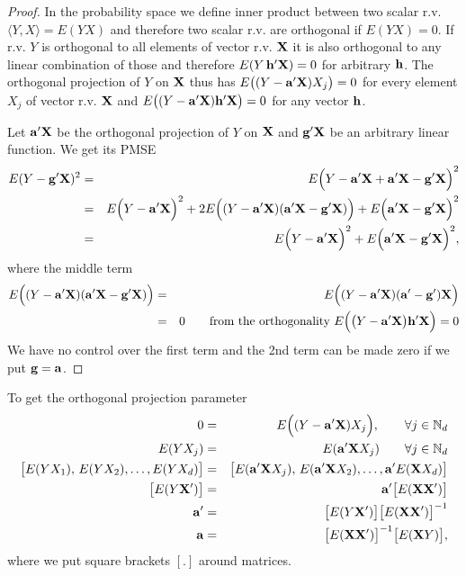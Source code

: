\begin{proof}
In the probability space we define inner product between two scalar r.v. $\langle Y,X\rangle = E(YX)$ and therefore two scalar r.v. are orthogonal if $E(YX) = 0$.
If r.v. $Y$ is orthogonal to all  elements of vector r.v. $\mathbf{X}$ it is also orthogonal to any linear combination of those and therefore $E(Y \, \mathbf{h'X}) = 0$ for arbitrary $\mathbf{h}$. 
The orthogonal projection of $Y$ on $\mathbf{X}$ thus has $E\big( (Y-\mathbf{a'X})X_j \big) = 0$ for every element $X_j$ of vector r.v. $\mathbf{X}$ and $E\big( (Y-\mathbf{a'X}) \mathbf{h'X} \big) = 0$ for any vector $\mathbf{h}$.

Let $\mathbf{a}'\mathbf{X}$ be the orthogonal projection of $Y$ on $\mathbf{X}$ and $\mathbf{g}'\mathbf{X}$ be an arbitrary linear function. We get its PMSE
\begin{eqnarray*}
E (Y - \mathbf{g}'\mathbf{X})^2 & = & E \Big( Y - \mathbf{a}'\mathbf{X} + \mathbf{a}'\mathbf{X} - \mathbf{g}'\mathbf{X} \Big)^2 \\
& =& E \Big( Y - \mathbf{a}'\mathbf{X} \Big)^2 + 2 E \Big( ( Y - \mathbf{a}'\mathbf{X} ) ( \mathbf{a}'\mathbf{X} - \mathbf{g}'\mathbf{X} ) \Big) + E \Big( \mathbf{a}'\mathbf{X} - \mathbf{g}'\mathbf{X} \Big)^2 \\
& =& E \Big( Y - \mathbf{a}'\mathbf{X}\Big)^2 + E \Big( \mathbf{a}'\mathbf{X} - \mathbf{g}'\mathbf{X} \Big)^2,
\end{eqnarray*}
where the middle term
\begin{eqnarray*}
E \Big( ( Y - \mathbf{a}'\mathbf{X} ) ( \mathbf{a}'\mathbf{X} - \mathbf{g}'\mathbf{X} ) \Big) & = & E \Big( ( Y - \mathbf{a}'\mathbf{X} ) ( \mathbf{a}' - \mathbf{g}') \mathbf{X} \Big) \\
& = & 0 \qquad \text{from the orthogonality } E \Big( \big( Y - \mathbf{a}'\mathbf{X} \big) \mathbf{h}' \mathbf{X} \Big) = 0 
\end{eqnarray*}
We have no control over the first term and the 2nd term can be made zero if we put $\mathbf{g} = \mathbf{a}$.
\end{proof}

To get the orthogonal projection parameter
\begin{eqnarray}
0 & = & E \Big( ( Y - \mathbf{a}'\mathbf{X} ) X_j \Big), \qquad \forall j \in \mathbb{N}_d \nonumber \\
 E (Y X_j) & = & E( \mathbf{a'X} X_j)  \qquad \forall j \in \mathbb{N}_d \nonumber \\
 \big[ E (Y X_1), \, E (Y X_2), \ldots, E (Y X_d) \big]  & = & \big[ E( \mathbf{a'X} X_j), \, E( \mathbf{a'X} X_2), \ldots, \mathbf{a}' E( \mathbf{X} X_d) \big] \nonumber \\
\big[ E(Y\mathbf{X'}) \big] & = & \mathbf{a'} \big[ E(\mathbf{XX'}) \big] \nonumber \\
\mathbf{a'} & = & \big[ E(Y\mathbf{X'}) \big] \big[ E(\mathbf{XX'}) \big]^{-1} \nonumber \\
\mathbf{a} & = & \big[ E(\mathbf{XX'}) \big]^{-1} \big[ E(\mathbf{X}Y) \big], 
\end{eqnarray}
where we put square brackets $[ . ]$ around matrices.

